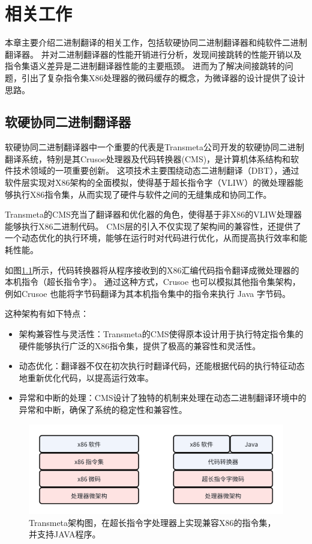 \chapter{相关工作}\label{chap:related_work}

本章主要介绍二进制翻译的相关工作，包括软硬协同二进制翻译器和纯软件二进制翻译器。
并对二进制翻译器的性能开销进行分析，发现间接跳转的性能开销以及指令集语义差异是二进制翻译器性能的主要瓶颈。
进而为了解决间接跳转的问题，引出了复杂指令集X86处理器的微码缓存的概念，为微译器的设计提供了设计思路。

\section{软硬协同二进制翻译器}

软硬协同二进制翻译器中一个重要的代表是Transmeta公司开发的软硬协同二进制翻译系统，特别是其Crusoe处理器及代码转换器(CMS)，是计算机体系结构和软件技术领域的一项重要创新。
这项技术主要围绕动态二进制翻译（DBT），通过软件层实现对X86架构的全面模拟，使得基于超长指令字（VLIW）的微处理器能够执行X86指令集，从而实现了硬件与软件之间的无缝集成和协同工作。

Transmeta的CMS充当了翻译器和优化器的角色，使得基于非X86的VLIW处理器能够执行X86二进制代码。
CMS层的引入不仅实现了架构间的兼容性，还提供了一个动态优化的执行环境，能够在运行时对代码进行优化，从而提高执行效率和能耗性能\cite{dehnertTransmetaCodeMorphing2003}。

如图\ref{img:transmeta_arch}所示，代码转换器将从程序接收到的X86汇编代码指令翻译成微处理器的本机指令（超长指令字）。
通过这种方式，Crusoe 也可以模拟其他指令集架构，例如Crusoe 也能将字节码翻译为其本机指令集中的指令来执行 Java 字节码。

这种架构有如下特点：
\begin{itemize}
\item 架构兼容性与灵活性：Transmeta的CMS使得原本设计用于执行特定指令集的硬件能够执行广泛的X86指令集，提供了极高的兼容性和灵活性。
\item 动态优化：翻译器不仅在初次执行时翻译代码，还能根据代码的执行特征动态地重新优化代码，以提高运行效率。
\item 异常和中断的处理：CMS设计了独特的机制来处理在动态二进制翻译环境中的异常和中断，确保了系统的稳定性和兼容性\cite{dehnertTransmetaCodeMorphing2003}。
\end{itemize}

\begin{figure}[!htbp]
    \centering
    \includegraphics[width=0.8\linewidth]{./feishuImage/transmeta_arch.png}
    \caption{Transmeta架构图，在超长指令字处理器上实现兼容X86的指令集，并支持JAVA程序。}
    \label{img:transmeta_arch}
  \end{figure}


